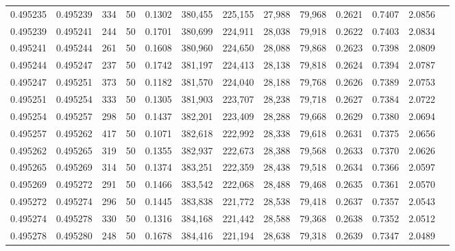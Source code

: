 \begin{tabular}{rrrrrrrrrrrrr}
0.495235 & 0.495239 &   334 &  50 &                                     0.1302 & 380,455 & 225,155 &  27,988 &  79,968 & 0.2621 & 0.7407 & 2.0856 \\
0.495239 & 0.495241 &   244 &  50 &                                     0.1701 & 380,699 & 224,911 &  28,038 &  79,918 & 0.2622 & 0.7403 & 2.0834 \\
0.495241 & 0.495244 &   261 &  50 &                                     0.1608 & 380,960 & 224,650 &  28,088 &  79,868 & 0.2623 & 0.7398 & 2.0809 \\
0.495244 & 0.495247 &   237 &  50 &                                     0.1742 & 381,197 & 224,413 &  28,138 &  79,818 & 0.2624 & 0.7394 & 2.0787 \\
0.495247 & 0.495251 &   373 &  50 &                                     0.1182 & 381,570 & 224,040 &  28,188 &  79,768 & 0.2626 & 0.7389 & 2.0753 \\
0.495251 & 0.495254 &   333 &  50 &                                     0.1305 & 381,903 & 223,707 &  28,238 &  79,718 & 0.2627 & 0.7384 & 2.0722 \\
0.495254 & 0.495257 &   298 &  50 &                                     0.1437 & 382,201 & 223,409 &  28,288 &  79,668 & 0.2629 & 0.7380 & 2.0694 \\
0.495257 & 0.495262 &   417 &  50 &                                     0.1071 & 382,618 & 222,992 &  28,338 &  79,618 & 0.2631 & 0.7375 & 2.0656 \\
0.495262 & 0.495265 &   319 &  50 &                                     0.1355 & 382,937 & 222,673 &  28,388 &  79,568 & 0.2633 & 0.7370 & 2.0626 \\
0.495265 & 0.495269 &   314 &  50 &                                     0.1374 & 383,251 & 222,359 &  28,438 &  79,518 & 0.2634 & 0.7366 & 2.0597 \\
0.495269 & 0.495272 &   291 &  50 &                                     0.1466 & 383,542 & 222,068 &  28,488 &  79,468 & 0.2635 & 0.7361 & 2.0570 \\
0.495272 & 0.495274 &   296 &  50 &                                     0.1445 & 383,838 & 221,772 &  28,538 &  79,418 & 0.2637 & 0.7357 & 2.0543 \\
0.495274 & 0.495278 &   330 &  50 &                                     0.1316 & 384,168 & 221,442 &  28,588 &  79,368 & 0.2638 & 0.7352 & 2.0512 \\
0.495278 & 0.495280 &   248 &  50 &                                     0.1678 & 384,416 & 221,194 &  28,638 &  79,318 & 0.2639 & 0.7347 & 2.0489 \\

\end{tabular}
